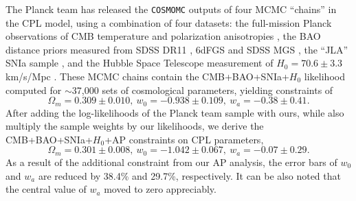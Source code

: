 \documentclass[prl,twocolumn,superscriptaddress,aps,amsmath,amssymb,nofootinbib,altaffilletter]{revtex4}
\begin{document}
The Planck team has released the {\texttt {COSMOMC}} \citep{LB2002} outputs of four MCMC ``chains'' in the CPL model, 
using a combination of four datasets:
the full-mission Planck observations of CMB temperature and polarization anisotropies \cite{Planck2015},
the BAO distance priors measured from SDSS DR11 \citep{Anderson2013}, 6dFGS \citep{6dFGS} and SDSS MGS \citep{MGS},
the ``JLA'' SNIa sample \citep{JLA},
and the Hubble Space Telescope measurement of $H_0=70.6\pm3.3$ km/s/Mpc \cite{Riess2011,E14H0}.
These MCMC chains contain the CMB+BAO+SNIa+$H_0$ likelihood computed for $\sim$37,000 sets of cosmological parameters,
yielding constraints of %
\small
\begin{equation}
 \Omega_m = 0.309 \pm 0.010,\
 w_0 = -0.938 \pm 0.109,\
 w_a = -0.38 \pm 0.41.
\end{equation}
\normalsize
After adding the log-likelihoods of the Planck team sample with ours, 
while also multiply the sample weights by our likelihoods, 
we derive the CMB+BAO+SNIa+$H_0$+AP constraints on CPL parameters, %
\small
\begin{equation}
 \Omega_m = 0.301 \pm 0.008,\
 w_0 = -1.042 \pm 0.067,\
 w_a = -0.07 \pm 0.29.
\end{equation}
\normalsize
As a result of the additional constraint from our AP analysis,
the error bars of $w_0$ and $w_a$ are reduced by 38.4\% and 29.7\%, respectively.%
It can be also noted that the central value of $w_a$ moved to zero appreciably.
\end{document}
